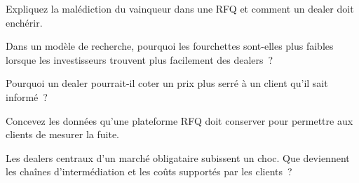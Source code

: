 \begin{interviewq}\label{iq:mx:request-for-quote-and-dealer-markets-in-theory:2}
Expliquez la malédiction du vainqueur dans une RFQ et comment un dealer doit enchérir.
\end{interviewq}

\begin{interviewq}\label{iq:mx:request-for-quote-and-dealer-markets-in-theory:3}
Dans un modèle de recherche, pourquoi les fourchettes sont-elles plus faibles lorsque les investisseurs trouvent plus facilement des dealers~?
\end{interviewq}

\begin{interviewq}\label{iq:mx:request-for-quote-and-dealer-markets-in-theory:4}
Pourquoi un dealer pourrait-il coter un prix plus serré à un client qu'il sait informé~?
\end{interviewq}

\begin{interviewq}\label{iq:mx:request-for-quote-and-dealer-markets-in-theory:5}
Concevez les données qu'une plateforme RFQ doit conserver pour permettre aux clients de mesurer la fuite.
\end{interviewq}

\begin{interviewq}\label{iq:mx:request-for-quote-and-dealer-markets-in-theory:6}
Les dealers centraux d'un marché obligataire subissent un choc. Que deviennent les chaînes d'intermédiation et les coûts supportés par les clients~?
\end{interviewq}

